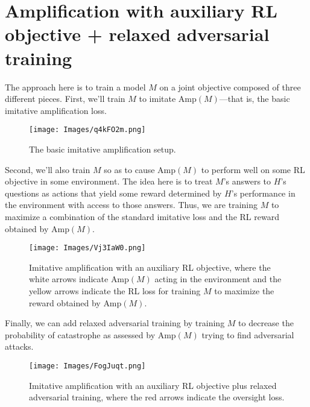 \documentclass[
  onecolumn,
  natbib,
]{miri-tech-article}
\begin{document}
\section{Amplification with auxiliary RL objective + relaxed adversarial training}
\label{sec:10}

The approach here is to train a model $M$ on a joint objective composed of three different pieces. First, we'll train $M$ to imitate $\text{Amp}(M)$---that is, the basic imitative amplification loss.

\vspace{4mm}

\begin{figure}[H]
  \centering
  \texttt{[image: Images/q4kFO2m.png]}
  \caption{The basic imitative amplification setup.}
\end{figure}

\vspace{2mm}

\noindent Second, we'll also train $M$ so as to cause $\text{Amp}(M)$ to perform well on some RL objective in some environment. The idea here is to treat $M$'s answers to $H$'s questions as actions that yield some reward determined by $H$'s performance in the environment with access to those answers. Thus, we are training $M$ to maximize a combination of the standard imitative loss and the RL reward obtained by $\text{Amp}(M)$.

\vspace{4mm}

\begin{figure}[H]
  \centering
  \texttt{[image: Images/Vj3IaW0.png]}
  \caption{Imitative amplification with an auxiliary RL objective, where the white arrows indicate $\text{Amp}(M)$ acting in the environment and the yellow arrows indicate the RL loss for training $M$ to maximize the reward obtained by $\text{Amp}(M)$.}
\end{figure}

\vspace{2mm}

\noindent Finally, we can add relaxed adversarial training by training $M$ to decrease the probability of catastrophe as assessed by $\text{Amp}(M)$ trying to find adversarial attacks.

\vspace{4mm}

\begin{figure}[H]
  \centering
  \texttt{[image: Images/FogJuqt.png]}
  \caption{Imitative amplification with an auxiliary RL objective plus relaxed adversarial training, where the red arrows indicate the oversight loss.}
\end{figure}
\end{document}
